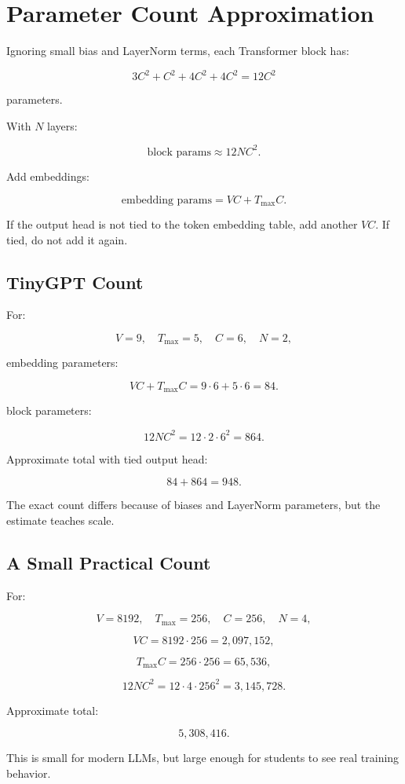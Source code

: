 \section{Parameter Count Approximation}

Ignoring small bias and LayerNorm terms, each Transformer block has:

\[
3C^2 + C^2 + 4C^2 + 4C^2 = 12C^2
\]

parameters.

With \(N\) layers:

\[
\text{block params}\approx 12NC^2.
\]

Add embeddings:

\[
\text{embedding params}=VC+T_{\max}C.
\]

If the output head is not tied to the token embedding table, add another \(VC\). If tied, do not add it again.

\subsection{TinyGPT Count}

For:

\[
V=9,\quad T_{\max}=5,\quad C=6,\quad N=2,
\]

embedding parameters:

\[
VC+T_{\max}C=9\cdot6+5\cdot6=84.
\]

block parameters:

\[
12NC^2=12\cdot2\cdot6^2=864.
\]

Approximate total with tied output head:

\[
84+864=948.
\]

The exact count differs because of biases and LayerNorm parameters, but the estimate teaches scale.

\subsection{A Small Practical Count}

For:

\[
V=8192,\quad T_{\max}=256,\quad C=256,\quad N=4,
\]

\[
VC=8192\cdot256=2{,}097{,}152,
\]

\[
T_{\max}C=256\cdot256=65{,}536,
\]

\[
12NC^2=12\cdot4\cdot256^2=3{,}145{,}728.
\]

Approximate total:

\[
5{,}308{,}416.
\]

This is small for modern LLMs, but large enough for students to see real training behavior.

